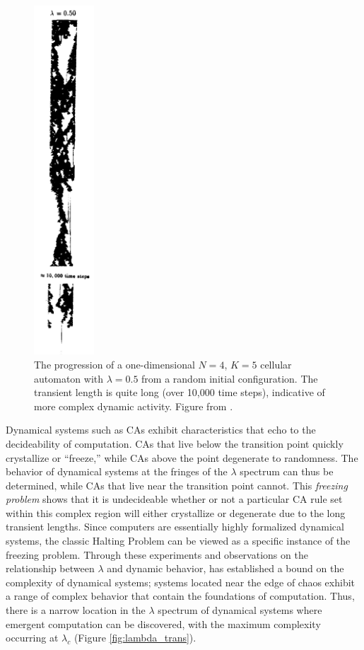 \documentclass[a4paper,11pt]{article}
\begin{document}
\begin{figure}[htp]
\centering
\includegraphics[width=0.20\textwidth]{long_transient.png}
\caption[Complex CA Transient Length]{
The progression of a one-dimensional $N=4$, $K=5$ cellular automaton with $\lambda=0.5$ from a random initial configuration. The transient length is quite long (over 10,000 time steps), indicative of more complex dynamic activity. Figure from \citeauthor{la90} \cite{la90}.
}
\label{fig:long_trans}
\end{figure}

Dynamical systems such as CAs exhibit characteristics that echo to the decideability of computation. CAs that live below the transition point quickly crystallize or ``freeze,'' while CAs above the point degenerate to randomness. The behavior of dynamical systems at the fringes of the $\lambda$ spectrum can thus be determined, while CAs that live near the transition point cannot. This \textit{freezing problem} shows that it is undecideable whether or not a particular CA rule set within this complex region will either crystallize or degenerate due to the long transient lengths. Since computers are essentially highly formalized dynamical systems, the classic Halting Problem can be viewed as a specific instance of the freezing problem. Through these experiments and observations on the relationship between $\lambda$ and dynamic behavior, \citeauthor{la90} has established a bound on the complexity of dynamical systems; systems located near the edge of chaos exhibit a range of complex behavior that contain the foundations of computation. Thus, there is a narrow location in the $\lambda$ spectrum of dynamical systems where emergent computation can be discovered, with the maximum complexity occurring at $\lambda_c$ (Figure \ref{fig:lambda_trans}).
\end{document}
